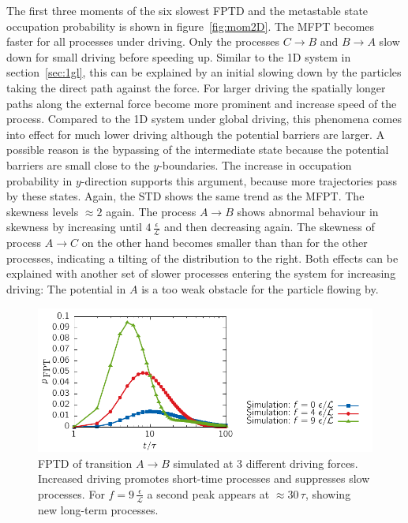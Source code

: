 The first three moments of the six slowest FPTD and the metastable state occupation probability is shown in figure~\ref{fig:mom2D}. The MFPT becomes faster for all processes under driving. Only the processes $C \rightarrow B$ and $B \rightarrow A$ slow down for small driving before speeding up. Similar to the 1D system in section~\ref{sec:1gl}, this can be explained by an initial slowing down by the particles taking the direct path against the force. For larger driving the spatially longer paths along the external force become more prominent and increase speed of the process. Compared to the 1D system under global driving, this phenomena comes into effect for much lower driving although the potential barriers are larger.  A possible reason is the bypassing of the intermediate state because the potential barriers are small close to the $y$-boundaries. The increase in occupation probability in $y$-direction supports this argument, because more trajectories pass by these states. Again, the STD shows the same trend as the MFPT. The skewness levels $\approx 2$ again. The process $A \rightarrow B$ shows abnormal behaviour in skewness by increasing until $4\,\frac{\epsilon}{\mathcal{L}}$ and then decreasing again. The skewness of process $A \rightarrow C$ on the other hand becomes smaller than than for the other processes, indicating a tilting of the distribution to the right. Both effects can be explained with another set of slower processes entering the system for increasing driving: The potential in $A$ is a too weak obstacle for the particle flowing by.
\begin{figure}[t]
\centering
 \includegraphics{../plots/Urew/fpt_5010.pdf}
 \caption[First-passage time distribution of transition $A \rightarrow B$ simulated at 3 different driving forces for the 2 system.]{FPTD of transition $A \rightarrow B$ simulated at 3 different driving forces. Increased driving promotes short-time processes and suppresses slow processes. For $f =9\,\frac{\epsilon}{\mathcal{L}}$ a second peak appears at $\approx 30\,\tau$, showing new long-term processes.  }
 \label{fig:fpt2D}
\end{figure}
